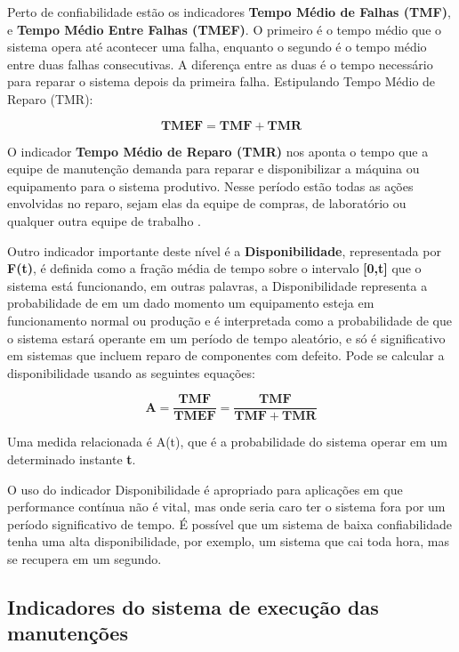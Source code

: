 Perto de confiabilidade estão os indicadores \textbf{Tempo Médio de Falhas (TMF)}, e \textbf{Tempo Médio Entre Falhas (TMEF)}. O primeiro é o tempo médio que o sistema opera até acontecer uma falha, enquanto o segundo é o tempo médio entre duas falhas consecutivas. A diferença entre as duas é o tempo necessário para reparar o sistema depois da primeira falha. Estipulando Tempo Médio de Reparo (TMR):

\begin{equation}
\label{eqn02}
	\mathbf{TMEF} = \mathbf{TMF} + \mathbf{TMR} 
\end{equation}

O indicador \textbf{Tempo Médio de Reparo (TMR)} nos aponta o tempo que a equipe de manutenção demanda para reparar e disponibilizar a máquina ou equipamento para o sistema produtivo. Nesse período estão todas as ações envolvidas no reparo, sejam elas da equipe de compras, de laboratório ou qualquer outra equipe de trabalho \cite{ZEN2008}.

Outro indicador importante deste nível é a \textbf{Disponibilidade}, representada por \textbf{F(t)}, é definida como a fração média de tempo sobre o intervalo \textbf{[0,t]} que o sistema está funcionando, em outras palavras, a Disponibilidade representa a probabilidade de em um dado momento um equipamento esteja em funcionamento normal ou produção e é interpretada como a probabilidade de que o sistema estará operante em um período de tempo aleatório, e só é significativo em sistemas que incluem reparo de componentes com defeito. Pode se calcular a disponibilidade usando as seguintes equações:

\begin{equation}
\label{eqn03}
	\mathbf{A} = \mathbf{\frac{TMF}{TMEF}} = \mathbf{\frac{TMF}{TMF + TMR}}
\end{equation}

Uma medida relacionada é A(t), que é a probabilidade do sistema operar em um determinado instante \textbf{t}.

O uso do indicador Disponibilidade é apropriado para aplicações em que performance contínua não é vital, mas onde seria caro ter o sistema fora por um período significativo de tempo. É possível que um sistema de baixa confiabilidade tenha uma alta disponibilidade, por exemplo, um sistema que cai toda hora, mas se recupera em um segundo.

\subsection{Indicadores do sistema de execução das manutenções}
\label{nivel 2}

